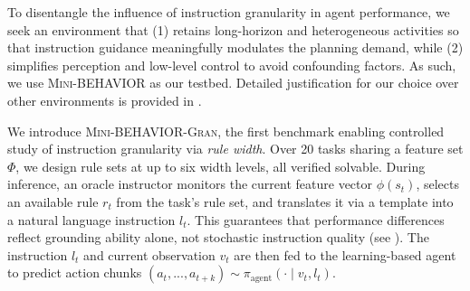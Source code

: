 \documentclass[11pt]{article}
\begin{document}

To disentangle the influence of instruction granularity in agent performance, we seek an environment that (1) retains long-horizon and heterogeneous activities so that instruction guidance meaningfully modulates the planning demand, while (2) simplifies perception and low-level control to avoid confounding factors. As such, we use \textsc{Mini-BEHAVIOR} \citep{jin2023minibehavior} as our testbed. Detailed justification for our choice over other environments is provided in .


We introduce \textsc{Mini-BEHAVIOR-Gran}, the first benchmark enabling controlled study of instruction granularity via \emph{rule width}. Over 20 tasks sharing a feature set $\Phi$, we design rule sets at up to six width levels, all verified solvable. During inference, an oracle instructor monitors the current feature vector $\phi(s_t)$, selects an available rule $r_t$ from the task's rule set, and translates it via a template into a natural language instruction $l_t$. This guarantees that performance differences reflect grounding ability alone, not stochastic instruction quality (see ). The instruction $l_t$ and current observation $v_t$ are then fed to the learning-based agent to predict action chunks $(a_t, ..., a_{t+k}) \sim \pi_{\text{agent}}(\cdot \mid v_t, l_t)$.



\end{document}
